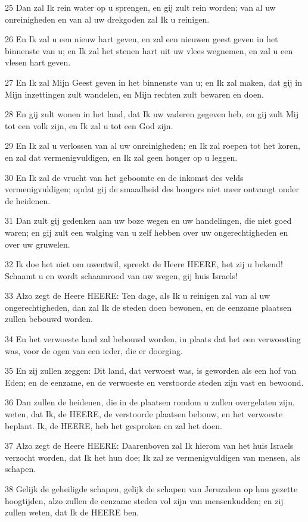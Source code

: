 \par 25 Dan zal Ik rein water op u sprengen, en gij zult rein worden; van al uw onreinigheden en van al uw drekgoden zal Ik u reinigen.
\par 26 En Ik zal u een nieuw hart geven, en zal een nieuwen geest geven in het binnenste van u; en Ik zal het stenen hart uit uw vlees wegnemen, en zal u een vlesen hart geven.
\par 27 En Ik zal Mijn Geest geven in het binnenste van u; en Ik zal maken, dat gij in Mijn inzettingen zult wandelen, en Mijn rechten zult bewaren en doen.
\par 28 En gij zult wonen in het land, dat Ik uw vaderen gegeven heb, en gij zult Mij tot een volk zijn, en Ik zal u tot een God zijn.
\par 29 En Ik zal u verlossen van al uw onreinigheden; en Ik zal roepen tot het koren, en zal dat vermenigvuldigen, en Ik zal geen honger op u leggen.
\par 30 En Ik zal de vrucht van het geboomte en de inkomst des velds vermenigvuldigen; opdat gij de smaadheid des hongers niet meer ontvangt onder de heidenen.
\par 31 Dan zult gij gedenken aan uw boze wegen en uw handelingen, die niet goed waren; en gij zult een walging van u zelf hebben over uw ongerechtigheden en over uw gruwelen.
\par 32 Ik doe het niet om uwentwil, spreekt de Heere HEERE, het zij u bekend! Schaamt u en wordt schaamrood van uw wegen, gij huis Israels!
\par 33 Alzo zegt de Heere HEERE: Ten dage, als Ik u reinigen zal van al uw ongerechtigheden, dan zal Ik de steden doen bewonen, en de eenzame plaatsen zullen bebouwd worden.
\par 34 En het verwoeste land zal bebouwd worden, in plaats dat het een verwoesting was, voor de ogen van een ieder, die er doorging.
\par 35 En zij zullen zeggen: Dit land, dat verwoest was, is geworden als een hof van Eden; en de eenzame, en de verwoeste en verstoorde steden zijn vast en bewoond.
\par 36 Dan zullen de heidenen, die in de plaatsen rondom u zullen overgelaten zijn, weten, dat Ik, de HEERE, de verstoorde plaatsen bebouw, en het verwoeste beplant. Ik, de HEERE, heb het gesproken en zal het doen.
\par 37 Alzo zegt de Heere HEERE: Daarenboven zal Ik hierom van het huis Israels verzocht worden, dat Ik het hun doe; Ik zal ze vermenigvuldigen van mensen, als schapen.
\par 38 Gelijk de geheiligde schapen, gelijk de schapen van Jeruzalem op hun gezette hoogtijden, alzo zullen de eenzame steden vol zijn van mensenkudden; en zij zullen weten, dat Ik de HEERE ben.

